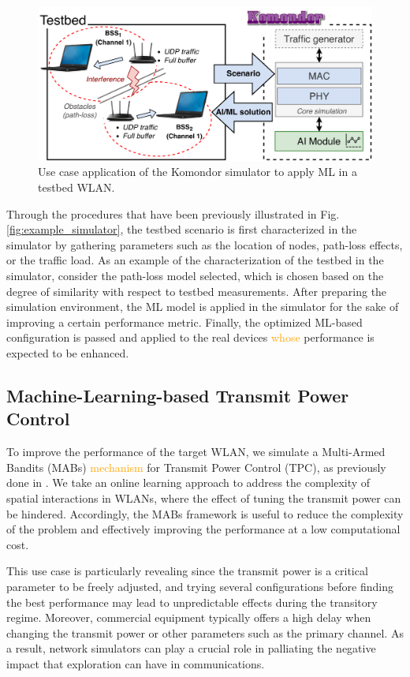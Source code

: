 \documentclass[journal]{IEEEtran}
\begin{document}
	\begin{figure}[ht!]
		\centering
		\includegraphics[width=\columnwidth]{testbed2.pdf}
		\caption{Use case application of the Komondor simulator to apply ML in a testbed WLAN.}
		\label{fig:testbed}
	\end{figure}

	Through the procedures that have been previously illustrated in Fig. \ref{fig:example_simulator}, the testbed scenario is first characterized in the simulator by gathering parameters such as the location of nodes, path-loss effects, or the traffic load. As an example of the characterization of the testbed in the simulator, consider the path-loss model selected, which is chosen based on the degree of similarity with respect to testbed measurements. After preparing the simulation environment, the ML model is applied in the simulator for the sake of improving a certain performance metric. Finally, the optimized ML-based configuration is passed and applied to the real devices \textcolor{orange}{whose} performance is expected to be enhanced.
	
	\subsection{Machine-Learning-based Transmit Power Control}
	To improve the performance of the target WLAN, we simulate a Multi-Armed Bandits (MABs) \textcolor{orange}{mechanism} for Transmit Power Control (TPC), as previously done in \cite{wilhelmi}. We take an online learning approach to address the complexity of spatial interactions in WLANs, where the effect of tuning the transmit power can be hindered. Accordingly, the MABs framework is useful to reduce the complexity of the problem and effectively improving the performance at a low computational cost. 
	
	This use case is particularly revealing since the transmit power is a critical parameter to be freely adjusted, and trying several configurations before finding the best performance may lead to unpredictable effects during the transitory regime. Moreover, commercial equipment typically offers a high delay when changing the transmit power or other parameters such as the primary channel. As a result, network simulators can play a crucial role in palliating the negative impact that exploration can have in communications.
	
\end{document}
